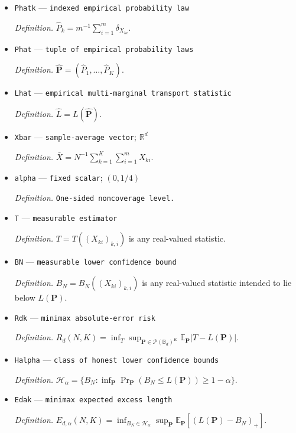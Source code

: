 \documentclass{article}
\begin{document}
\begin{itemize}
  \item \texttt{Phatk} --- \texttt{indexed empirical probability law}
  \par\smallskip\noindent\emph{Definition.} \(\widehat P_k=m^{-1}\sum_{i=1}^m\delta_{X_{ki}}\).
  \item \texttt{Phat} --- \texttt{tuple of empirical probability laws}
  \par\smallskip\noindent\emph{Definition.} \(\widehat{\mathbf P}=(\widehat P_1,\ldots,\widehat P_K)\).
  \item \texttt{Lhat} --- \texttt{empirical multi-\allowbreak{}marginal transport statistic}
  \par\smallskip\noindent\emph{Definition.} \(\widehat L=L(\widehat{\mathbf P})\).
  \item \texttt{Xbar} --- \texttt{sample-\allowbreak{}average vector}; \(\mathbb R^d\)
  \par\smallskip\noindent\emph{Definition.} \(\bar X=N^{-1}\sum_{k=1}^K\sum_{i=1}^mX_{ki}\).
  \item \texttt{alpha} --- \texttt{fixed scalar}; \((0,1/4)\)
  \par\smallskip\noindent\emph{Definition.} \texttt{One-\allowbreak{}sided noncoverage level.}
  \item \texttt{T} --- \texttt{measurable estimator}
  \par\smallskip\noindent\emph{Definition.} \(T=T((X_{ki})_{k,i})\) is any real-valued statistic.
  \item \texttt{BN} --- \texttt{measurable lower confidence bound}
  \par\smallskip\noindent\emph{Definition.} \(B_N=B_N((X_{ki})_{k,i})\) is any real-valued statistic intended to lie below \(L(\mathbf P)\).
  \item \texttt{Rdk} --- \texttt{minimax absolute-\allowbreak{}error risk}
  \par\smallskip\noindent\emph{Definition.} \(R_d(N,K)=\inf_T\sup_{\mathbf P\in\mathcal P(\mathbb B_d)^K}\mathbb E_{\mathbf P}|T-L(\mathbf P)|\).
  \item \texttt{Halpha} --- \texttt{class of honest lower confidence bounds}
  \par\smallskip\noindent\emph{Definition.} \(\mathcal H_\alpha=\{B_N:\inf_{\mathbf P}\Pr_{\mathbf P}(B_N\le L(\mathbf P))\ge1-\alpha\}\).
  \item \texttt{Edak} --- \texttt{minimax expected excess length}
  \par\smallskip\noindent\emph{Definition.} \(E_{d,\alpha}(N,K)=\inf_{B_N\in\mathcal H_\alpha}\sup_{\mathbf P}\mathbb E_{\mathbf P}[(L(\mathbf P)-B_N)_+]\).

\end{itemize}
\end{document}

